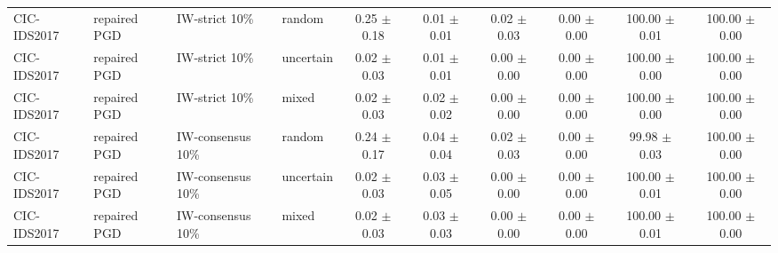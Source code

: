 \begin{table}[t]
\begin{tabular}{llllcccccc}
CIC-IDS2017 & repaired PGD & IW-strict 10\% & random & 0.25 $\pm$ 0.18 & 0.01 $\pm$ 0.01 & 0.02 $\pm$ 0.03 & 0.00 $\pm$ 0.00 & 100.00 $\pm$ 0.01 & 100.00 $\pm$ 0.00 \\
CIC-IDS2017 & repaired PGD & IW-strict 10\% & uncertain & 0.02 $\pm$ 0.03 & 0.01 $\pm$ 0.01 & 0.00 $\pm$ 0.00 & 0.00 $\pm$ 0.00 & 100.00 $\pm$ 0.00 & 100.00 $\pm$ 0.00 \\
CIC-IDS2017 & repaired PGD & IW-strict 10\% & mixed & 0.02 $\pm$ 0.03 & 0.02 $\pm$ 0.02 & 0.00 $\pm$ 0.00 & 0.00 $\pm$ 0.00 & 100.00 $\pm$ 0.00 & 100.00 $\pm$ 0.00 \\
CIC-IDS2017 & repaired PGD & IW-consensus 10\% & random & 0.24 $\pm$ 0.17 & 0.04 $\pm$ 0.04 & 0.02 $\pm$ 0.03 & 0.00 $\pm$ 0.00 & 99.98 $\pm$ 0.03 & 100.00 $\pm$ 0.00 \\
CIC-IDS2017 & repaired PGD & IW-consensus 10\% & uncertain & 0.02 $\pm$ 0.03 & 0.03 $\pm$ 0.05 & 0.00 $\pm$ 0.00 & 0.00 $\pm$ 0.00 & 100.00 $\pm$ 0.01 & 100.00 $\pm$ 0.00 \\
CIC-IDS2017 & repaired PGD & IW-consensus 10\% & mixed & 0.02 $\pm$ 0.03 & 0.03 $\pm$ 0.03 & 0.00 $\pm$ 0.00 & 0.00 $\pm$ 0.00 & 100.00 $\pm$ 0.01 & 100.00 $\pm$ 0.00 \\
\bottomrule
\end{tabular}
\end{table}
